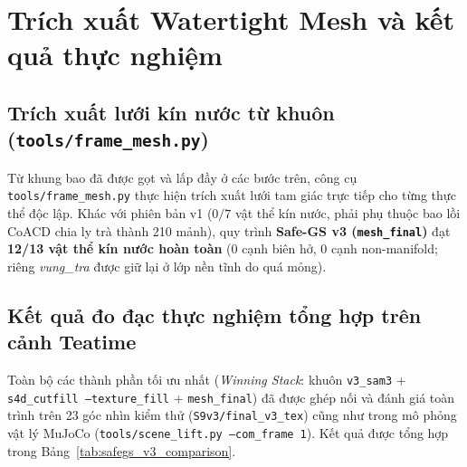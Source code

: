 \section{Trích xuất Watertight Mesh và kết quả thực nghiệm}
\subsection{Trích xuất lưới kín nước từ khuôn (\texttt{tools/frame\_mesh.py})}
Từ khung bao đã được gọt và lấp đầy ở các bước trên, công cụ \texttt{tools/frame\_mesh.py} thực hiện trích xuất lưới tam giác trực tiếp cho từng thực thể độc lập. Khác với phiên bản v1 ($0/7$ vật thể kín nước, phải phụ thuộc bao lồi CoACD chia ly trà thành 210 mảnh), quy trình \textbf{Safe-GS v3 (\texttt{mesh\_final})} đạt \textbf{12/13 vật thể kín nước hoàn toàn} ($0$ cạnh biên hở, $0$ cạnh non-manifold; riêng \textit{vung\_tra} được giữ lại ở lớp nền tĩnh do quá mỏng).

\subsection{Kết quả đo đạc thực nghiệm tổng hợp trên cảnh Teatime}
Toàn bộ các thành phần tối ưu nhất (\textit{Winning Stack}: khuôn \texttt{v3\_sam3} + \texttt{s4d\_cutfill --texture\_fill} + \texttt{mesh\_final}) đã được ghép nối và đánh giá toàn trình trên 23 góc nhìn kiểm thử (\texttt{S9v3/final\_v3\_tex}) cũng như trong mô phỏng vật lý MuJoCo (\texttt{tools/scene\_lift.py --com\_frame 1}). Kết quả được tổng hợp trong Bảng~\ref{tab:safegs_v3_comparison}.

